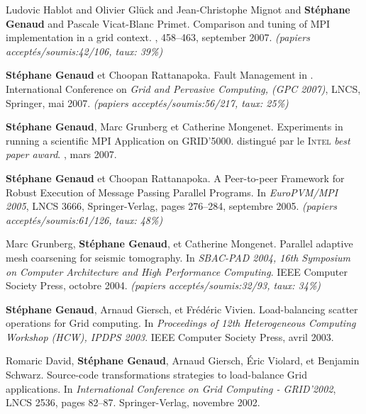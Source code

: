 \begin{thebibliography}{99}
Ludovic Hablot and Olivier Glück and Jean-Christophe Mignot and \textbf{Stéphane Genaud} and Pascale Vicat-Blanc Primet.
\newblock Comparison and tuning of MPI implementation in a grid context.
, 458--463, september 2007.
\newblock \small{\textit{(papiers acceptés/soumis:42/106, taux: 39\%)}}

\newblock \textbf{Stéphane Genaud} et Choopan Rattanapoka.
\newblock Fault Management in {\pmpi}. 
\newblock International Conference on {\em Grid and Pervasive Computing, 
(GPC 2007)}, LNCS, Springer, mai 2007.
\newblock \small{\textit{(papiers acceptés/soumis:56/217, taux: 25\%)}}

\newblock \textbf{Stéphane Genaud}, Marc Grunberg et Catherine Mongenet.
\newblock Experiments in running a scientific {MPI} Application on GRID'5000. 
\newblock distingué par le \textsc{Intel} \textit{best paper award}.
, mars 2007.


\textbf{Stéphane Genaud} et Choopan Rattanapoka.
\newblock A Peer-to-peer Framework for Robust Execution of Message Passing 
Parallel Programs.
\newblock 
In {\em EuroPVM/MPI 2005}, LNCS 3666, Springer-Verlag, pages 276--284, 
septembre 2005.
\newblock \small{\textit{(papiers acceptés/soumis:61/126, taux: 48\%)}}


Marc Grunberg, \textbf{Stéphane Genaud}, et Catherine Mongenet.
\newblock Parallel adaptive mesh coarsening for seismic tomography.
\newblock In {\em SBAC-PAD 2004, 16th Symposium on Computer Architecture and
  High Performance Computing}. IEEE Computer Society Press, octobre 2004.
\newblock \small{\textit{(papiers acceptés/soumis:32/93, taux: 34\%)}}

\textbf{Stéphane Genaud}, Arnaud Giersch, et Frédéric Vivien.
\newblock Load-balancing scatter operations for Grid computing.
\newblock In {\em Proceedings of 12th Heterogeneous Computing Workshop 
(HCW), IPDPS 2003}. IEEE Computer Society Press, avril 2003.

Romaric David, \textbf{Stéphane Genaud}, Arnaud Giersch, \'{E}ric Violard, et 
  Benjamin Schwarz.
\newblock Source-code transformations strategies to load-balance Grid
  applications.
\newblock In {\em International Conference on Grid Computing - GRID'2002}, 
LNCS 2536, pages 82--87. Springer-Verlag, novembre 2002.


\end{thebibliography}
